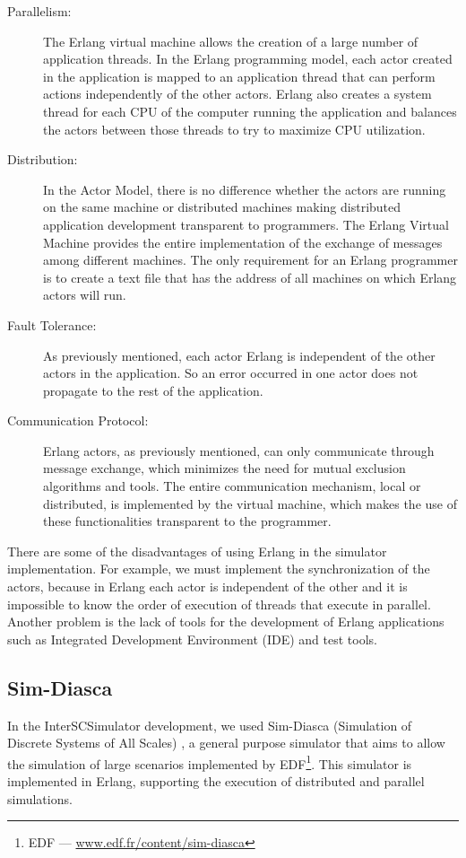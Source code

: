 \begin{description}

\item[Parallelism:] The Erlang virtual machine allows the creation of a large number of application threads. In the Erlang programming model, each actor created in the application is mapped to an application thread that can perform actions independently of the other actors. Erlang also creates a system thread for each CPU of the computer running the application and balances the actors between those threads to try to maximize CPU utilization.
\item[Distribution:] In the Actor Model, there is no difference whether the actors are running on the same machine or distributed machines making distributed application development transparent to programmers. The Erlang Virtual Machine provides the entire implementation of the exchange of messages among different machines. The only requirement for an Erlang programmer is to create a text file that has the address of all machines on which Erlang actors will run.
\item[Fault Tolerance:] As previously mentioned, each actor Erlang is independent of the other actors in the application. So an error occurred in one actor does not propagate to the rest of the application.
\item[Communication Protocol: ] Erlang actors, as previously mentioned, can only communicate through message exchange, which minimizes the need for mutual exclusion algorithms and tools. The entire communication mechanism, local or distributed, is implemented by the virtual machine, which makes the use of these functionalities transparent to the programmer.
\end{description}

There are some of the disadvantages of using Erlang in the simulator implementation. For example, we must implement the synchronization of the actors, because in Erlang each actor is independent of the other and it is impossible to know the order of execution of threads that execute in parallel. Another problem is the lack of tools for the development of Erlang applications such as Integrated Development Environment (IDE) and test tools.

\subsection{Sim-Diasca}
\label{subsub:simdiasca}

In the InterSCSimulator development, we used Sim-Diasca (Simulation of Discrete Systems of All Scales) \cite{song2011performance}, a general purpose simulator that aims to allow the simulation of large scenarios implemented by EDF\footnote{EDF --- \url{www.edf.fr/content/sim-diasca}}. This simulator is implemented in Erlang, supporting the execution of distributed and parallel simulations.


